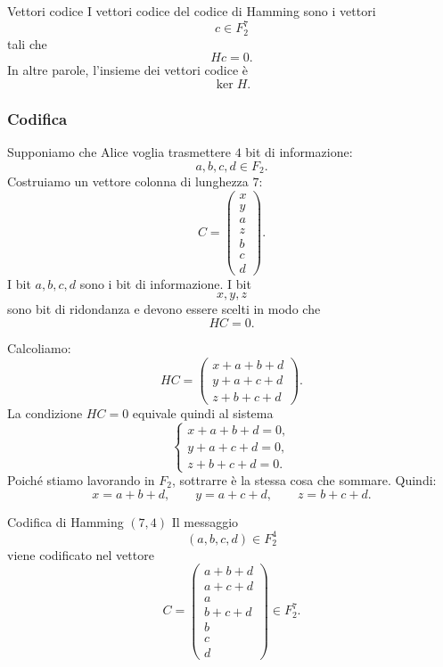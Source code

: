 \documentclass[a4paper]{article}
\begin{document}
\begin{snippetdefinition}{Vettori codice}
    I vettori codice del codice di Hamming sono i vettori
    \[
        c\in F_2^7
    \]
    tali che
    \[
        Hc=0.
    \]
    In altre parole, l'insieme dei vettori codice è
    \[
        \ker H.
    \]
\end{snippetdefinition}

\subsubsection{Codifica}

Supponiamo che Alice voglia trasmettere \(4\) bit di informazione:
\[
    a,b,c,d\in F_2.
\]
Costruiamo un vettore colonna di lunghezza \(7\):
\[
    C=
    \begin{pmatrix}
        x\\
        y\\
        a\\
        z\\
        b\\
        c\\
        d
    \end{pmatrix}.
\]
I bit \(a,b,c,d\) sono i bit di informazione. I bit
\[
    x,y,z
\]
sono bit di ridondanza e devono essere scelti in modo che
\[
    HC=0.
\]

Calcoliamo:
\[
    HC
    =
    \begin{pmatrix}
        x+a+b+d\\
        y+a+c+d\\
        z+b+c+d
    \end{pmatrix}.
\]
La condizione \(HC=0\) equivale quindi al sistema
\[
    \begin{cases}
        x+a+b+d=0,\\
        y+a+c+d=0,\\
        z+b+c+d=0.
    \end{cases}
\]
Poiché stiamo lavorando in \(F_2\), sottrarre è la stessa cosa che sommare. Quindi:
\[
    x=a+b+d,
    \qquad
    y=a+c+d,
    \qquad
    z=b+c+d.
\]

\begin{snippetdefinition}{Codifica di Hamming \((7,4)\)}
    Il messaggio
    \[
        (a,b,c,d)\in F_2^4
    \]
    viene codificato nel vettore
    \[
        C=
        \begin{pmatrix}
            a+b+d\\
            a+c+d\\
            a\\
            b+c+d\\
            b\\
            c\\
            d
        \end{pmatrix}
        \in F_2^7.
    \]
\end{snippetdefinition}
\end{document}
